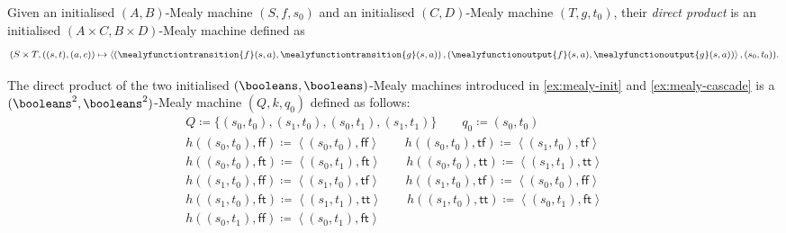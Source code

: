 \begin{definition}
    Given an initialised \((A,B)\)-Mealy machine \((S,f,s_0)\) and an
    initialised \((C,D)\)-Mealy machine \((T,g,t_0)\), their
    \emph{direct product} is an initialised \((A \times C,B \times D)\)-Mealy
    machine defined as \[
        (S \times T, \left((s, t), (a, c)\right) \mapsto \left\langle
        \left(
        \mealyfunctiontransition{f}\mleft(s, a\mright),
        \mealyfunctiontransition{g}\mleft(s, a\mright)
        \right),
        \left(
        \mealyfunctionoutput{f}\mleft(s, a\mright),
        \mealyfunctionoutput{g}\mleft(s, a\mright)
        \right)\right\rangle,
        (s_0, t_0)
        ).
    \]
\end{definition}

\begin{example}\label{ex:mealy-direct}
    The direct product of the two initialised \((\booleans,\booleans)\)-Mealy
    machines introduced in \cref{ex:mealy-init} and \cref{ex:mealy-cascade} is
    a \((\booleans^2,\booleans^2)\)-Mealy machine \((Q,k,q_0)\) defined as
    follows:
    \begin{gather*}
        Q \coloneqq \{(s_0,t_0), (s_1,t_0), (s_0,t_1), (s_1,t_1)\}
        \qquad
        q_0 \coloneqq (s_0,t_0)
        \\
        h((s_0, t_0), \mathsf{ff})
        \coloneqq
        \left\langle(s_0, t_0), \mathsf{ff}\right\rangle
        \qquad
        h((s_0, t_0), \mathsf{tf})
        \coloneqq
        \left\langle(s_1, t_0), \mathsf{tf}\right\rangle
        \\
        h((s_0, t_0), \mathsf{ft})
        \coloneqq
        \left\langle(s_0, t_1), \mathsf{ft}\right\rangle
        \qquad
        h((s_0, t_0), \mathsf{tt})
        \coloneqq
        \left\langle(s_1, t_1), \mathsf{tt}\right\rangle
        \\
        h((s_1, t_0), \mathsf{ff})
        \coloneqq
        \left\langle(s_1, t_0), \mathsf{tf}\right\rangle
        \qquad
        h((s_1, t_0), \mathsf{tf})
        \coloneqq
        \left\langle(s_0, t_0), \mathsf{ff}\right\rangle
        \\
        h((s_1, t_0), \mathsf{ft})
        \coloneqq
        \left\langle(s_1, t_1), \mathsf{tt}\right\rangle
        \qquad
        h((s_1, t_0), \mathsf{tt})
        \coloneqq
        \left\langle(s_0, t_1), \mathsf{ft}\right\rangle
        \\
        h((s_0, t_1), \mathsf{ff})
        \coloneqq
        \left\langle(s_0, t_1), \mathsf{ft}\right\rangle

\end{gather*}
\end{example}

